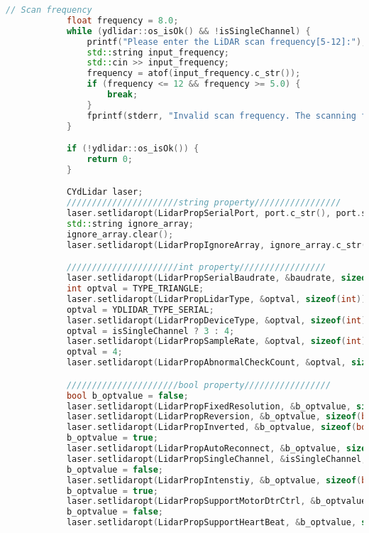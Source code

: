 \begin{lstlisting}[language={C++}, caption={C\'odigo de ejemplo de Kinect y LiDAR}, label={Script}]
            // Scan frequency
            float frequency = 8.0;
            while (ydlidar::os_isOk() && !isSingleChannel) {
                printf("Please enter the LiDAR scan frequency[5-12]:");
                std::string input_frequency;
                std::cin >> input_frequency;
                frequency = atof(input_frequency.c_str());
                if (frequency <= 12 && frequency >= 5.0) {
                    break;
                }
                fprintf(stderr, "Invalid scan frequency. The scanning frequency range is 5 to 12 Hz. Please re-enter.\n");
            }

            if (!ydlidar::os_isOk()) {
                return 0;
            }

            CYdLidar laser;
            //////////////////////string property/////////////////
            laser.setlidaropt(LidarPropSerialPort, port.c_str(), port.size());
            std::string ignore_array;
            ignore_array.clear();
            laser.setlidaropt(LidarPropIgnoreArray, ignore_array.c_str(), ignore_array.size());

            //////////////////////int property/////////////////
            laser.setlidaropt(LidarPropSerialBaudrate, &baudrate, sizeof(int));
            int optval = TYPE_TRIANGLE;
            laser.setlidaropt(LidarPropLidarType, &optval, sizeof(int));
            optval = YDLIDAR_TYPE_SERIAL;
            laser.setlidaropt(LidarPropDeviceType, &optval, sizeof(int));
            optval = isSingleChannel ? 3 : 4;
            laser.setlidaropt(LidarPropSampleRate, &optval, sizeof(int));
            optval = 4;
            laser.setlidaropt(LidarPropAbnormalCheckCount, &optval, sizeof(int));

            //////////////////////bool property/////////////////
            bool b_optvalue = false;
            laser.setlidaropt(LidarPropFixedResolution, &b_optvalue, sizeof(bool));
            laser.setlidaropt(LidarPropReversion, &b_optvalue, sizeof(bool));
            laser.setlidaropt(LidarPropInverted, &b_optvalue, sizeof(bool));
            b_optvalue = true;
            laser.setlidaropt(LidarPropAutoReconnect, &b_optvalue, sizeof(bool));
            laser.setlidaropt(LidarPropSingleChannel, &isSingleChannel, sizeof(bool));
            b_optvalue = false;
            laser.setlidaropt(LidarPropIntenstiy, &b_optvalue, sizeof(bool));
            b_optvalue = true;
            laser.setlidaropt(LidarPropSupportMotorDtrCtrl, &b_optvalue, sizeof(bool));
            b_optvalue = false;
            laser.setlidaropt(LidarPropSupportHeartBeat, &b_optvalue, sizeof(bool));


\end{lstlisting}
